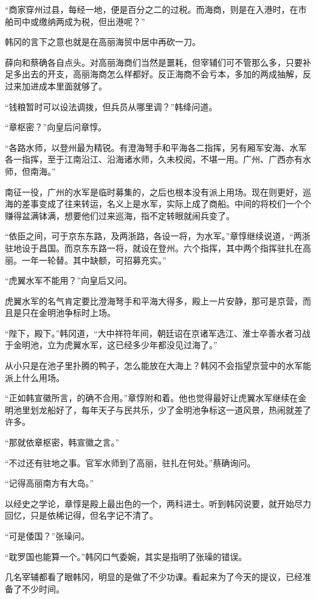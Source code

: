 “商家穿州过县，每经一地，便是百分之二的过税。而海商，则是在入港时，在市舶司中或缴纳两成为税，但出港呢？”

韩冈的言下之意也就是在高丽海贸中居中再砍一刀。

薛向和蔡确各自点头。对高丽海商们当然是噩耗，但宰辅们可不管那么多，只要补足多出去的开支，高丽海商怎么样都好。反正海商不会亏本，多加的两成抽解，反过来加进成本里面就够了。

“钱粮暂时可以设法调拨，但兵员从哪里调？”韩绛问道。

“章枢密？”向皇后问章惇。

“各路水师，以登州最为精锐。有澄海弩手和平海各二指挥，另有厢军安海、水军各一指挥，至于江南沿江、沿海诸水师，久未校阅，不堪一用。广州、广西亦有水师，但南海。”

南征一役，广州的水军是临时募集的，之后也根本没有派上用场。现在则更好，巡海的差事变成了往来转运，名义上是水军，实际上成了商船。中间的将校们一个个赚得盆满钵满，想要他们过来巡海，指不定转眼就闹兵变了。

“依臣之间，可于京东东路，及两浙路，各设一将，为水军。”章惇继续说道，“两浙驻地设于昌国。而京东东路一将，就设在登州。六个指挥，其中两个指挥驻扎在高丽。一年一轮替。其中缺额，可招募充实。”

“虎翼水军不能用？”向皇后又问。

虎翼水军的名气肯定要比澄海弩手和平海大得多，殿上一片安静，那可是京营，而且是只在金明池争标时上场。

“陛下，殿下。”韩冈道，“大中祥符年间，朝廷诏在京诸军选江、淮士卒善水者习战于金明池，立为虎翼水军，这已经多少年都没见过海了。”

从小只是在池子里扑腾的鸭子，怎么能放在大海上？韩冈不会指望京营中的水军能派上什么用场。

“正如韩宣徽所言，的确不合用。”章惇附和着。他也觉得最好让虎翼水军继续在金明池里划龙船好了，每年天子与民共乐，少了金明池争标这一道风景，热闹就差了许多。

“那就依章枢密，韩宣徽之言。”

“不过还有驻地之事。官军水师到了高丽，驻扎在何处。”蔡确询问。

“记得高丽南方有大岛。”

以经史之学论，章惇是殿上最出色的一个，两科进士。听到韩冈说要，就开始尽力回忆，只是依稀记得，但名字记不清了。

“可是倭国？”张璪问。

“耽罗国也能算一个。”韩冈口气委婉，其实是指明了张璪的错误。

几名宰辅都看了眼韩冈，明显的是做了不少功课。看起来为了今天的提议，已经准备了不少时间。


